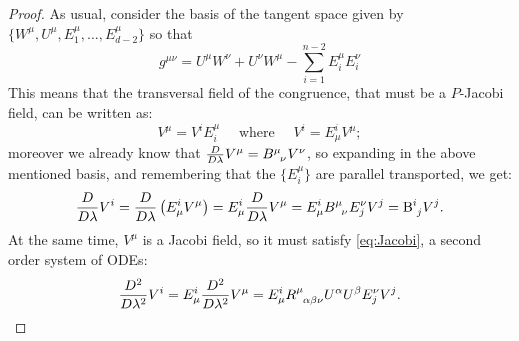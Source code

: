 	\begin{proof}
		As usual, consider the basis of the tangent space given by \(\{W^{\mu}, U^{\mu}, E_1^{\mu}, \ldots, E_{d - 2}^{\mu}\}\) so that
		\[
		g^{\mu\nu} = U^{\mu}W^{\nu} + U^{\nu}W^{\mu} - \sum_{i=1}^{n - 2}E_i^{\mu}E_i^{\nu}
		\]
		This means that the transversal field of the congruence, that must be a \(P\)-Jacobi field, can be written as:
		\[
		V^{\mu} = V^iE_i^{\mu} \quad \text{ where } \quad V^i = E^i_{\mu}V^{\mu};
		\]
		moreover we already know that \(\frac{D}{D\lambda}V^{\mu} = B\indices{^{\mu}_{\nu}}V^{\nu}\), so expanding in the above mentioned basis, and remembering that the \(\{E_i^{\mu}\}\) are parallel transported, we get:
		\begin{equation}
		\label{eq:1st-order-V_i}
			\frac{D}{D\lambda}V^i = \frac{D}{D\lambda}\left(E^i_{\mu}V^{\mu}\right) = E^i_{\mu}\frac{D}{D\lambda}V^{\mu} = E^i_{\mu}B\indices{^{\mu}_{\nu}}E_j^{\nu}V^j = \mathrm{B}\indices{^i_j}V^j.
		\end{equation}
		At the same time, \(V^{\mu}\) is a Jacobi field, so it must satisfy \eqref{eq:Jacobi}, a second order system of ODEs:
		\begin{equation}
			\label{eq:Jacobi-E_i}
			\frac{D^2}{D\lambda^2}V^i = E^i_{\mu}\frac{D^2}{D\lambda^2}V^{\mu} = E^i_{\mu}R\indices{^{\mu}_{\alpha\beta\nu}}U^{\alpha}U^{\beta}E_j^{\nu}V^j.
		\end{equation}
		

\end{proof}
